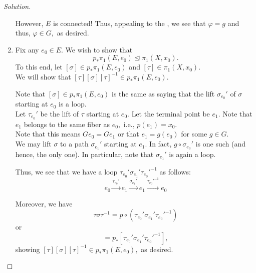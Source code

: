 \documentclass[12pt]{article}
\newenvironment{soln}{\begin{proof}[Solution]}{\end{proof}}
\begin{document}
\begin{soln}
\begin{enumerate}
		\begin{center}
		\end{center}

		However, $E$ is connected! Thus, appealing to the , we see that $\varphi = g$ and thus, $\varphi \in G,$ as desired.
		\item Fix any $e_0 \in E.$ We wish to show that
		\begin{equation*} 
			p_*\pi_1(E, e_0) \unlhd \pi_1(X, x_0).
		\end{equation*}
		To this end, let $[\sigma] \in p_*\pi_1(E, e_0)$ and $[\tau] \in \pi_1(X, x_0).$\\
		We will show that $[\tau][\sigma][\tau]^{-1} \in p_*\pi_1(E, e_0).$

		Note that $[\sigma] \in p_*\pi_1(E, e_0)$ is the same as saying that the lift $\sigma_{e_0}'$ of $\sigma$ starting at $e_0$ is a loop.\\
		Let $\tau_{e_0}'$ be the lift of $\tau$ starting at $e_0.$ Let the terminal point be $e_1.$ Note that $e_1$ belongs to the same fiber as $e_0,$ i.e., $p(e_1) = x_0.$ \\
		Note that this means $Ge_0 = Ge_1$ or that $e_1 = g(e_0)$ for some $g \in G.$\\
		We may lift $\sigma$ to a path $\sigma_{e_1}'$ starting at $e_1.$ In fact, $g\circ\sigma_{e_0}'$ is one such (and hence, the only one). In particular, note that $\sigma_{e_1}'$ is again a loop. 

		Thus, we see that we have a loop $\tau_{e_0}'\sigma_{e_1}'\tau_{e_0}'^{-1}$ as follows:
		\begin{equation*} 
			e_0 \overset{\tau_{e_0}'}{\longrightarrow} e_1 \overset{\sigma_{e_1}'}{\longrightarrow} e_1 \overset{\tau_{e_0}'^{-1}}{\longrightarrow} e_0
		\end{equation*}

		Moreover, we have
		\begin{equation*} 
			\tau\sigma\tau^{-1} = p\circ(\tau_{e_0}'\sigma_{e_1}'\tau_{e_0}'^{-1})
		\end{equation*}
		or
		\begin{equation*} 
			[\tau\sigma\tau^{-1}] = p_*[\tau_{e_0}'\sigma_{e_1}'\tau_{e_0}'^{-1}],
		\end{equation*}
		showing $[\tau][\sigma][\tau]^{-1} \in p_*\pi_1(E, e_0),$ as desired. \qedhere
	\end{enumerate}
\end{soln}
\end{document}
